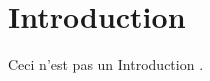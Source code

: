 \chapter{Introduction}\label{ch:intro}

Ceci n'est pas un Introduction \cite{guerin_benchmark_2009}.
